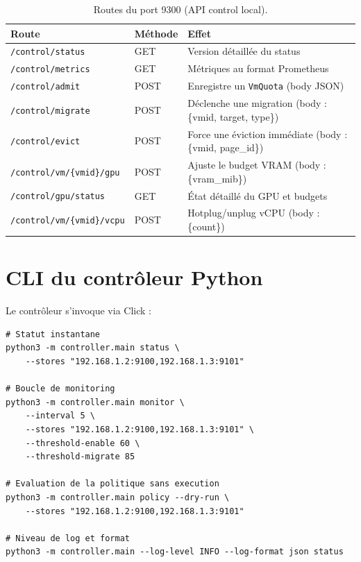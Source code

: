 \begin{table}[H]
\centering
\small
\caption{Routes du port 9300 (API control local).}
\begin{tabular}{lp{2.5cm}p{7.5cm}}
\toprule
\textbf{Route} & \textbf{Méthode} & \textbf{Effet} \\
\midrule
\texttt{/control/status}          & GET  & Version détaillée du status \\
\texttt{/control/metrics}         & GET  & Métriques au format Prometheus \\
\texttt{/control/admit}           & POST & Enregistre un \texttt{VmQuota} (body JSON) \\
\texttt{/control/migrate}         & POST & Déclenche une migration (body : \{vmid, target, type\}) \\
\texttt{/control/evict}           & POST & Force une éviction immédiate (body : \{vmid, page\_id\}) \\
\texttt{/control/vm/\{vmid\}/gpu} & POST & Ajuste le budget VRAM (body : \{vram\_mib\}) \\
\texttt{/control/gpu/status}      & GET  & État détaillé du GPU et budgets \\
\texttt{/control/vm/\{vmid\}/vcpu}& POST & Hotplug/unplug vCPU (body : \{count\}) \\
\bottomrule
\end{tabular}

\end{table}

\section{CLI du contrôleur Python}

Le contrôleur s'invoque via Click :

\begin{lstlisting}[basicstyle=\ttfamily\footnotesize, frame=single]
# Statut instantane
python3 -m controller.main status \
    --stores "192.168.1.2:9100,192.168.1.3:9101"

# Boucle de monitoring
python3 -m controller.main monitor \
    --interval 5 \
    --stores "192.168.1.2:9100,192.168.1.3:9101" \
    --threshold-enable 60 \
    --threshold-migrate 85

# Evaluation de la politique sans execution
python3 -m controller.main policy --dry-run \
    --stores "192.168.1.2:9100,192.168.1.3:9101"

# Niveau de log et format
python3 -m controller.main --log-level INFO --log-format json status
\end{lstlisting}
